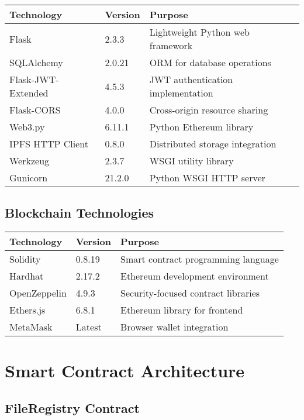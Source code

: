 \documentclass[11pt,a4paper]{article}
\begin{document}
\begin{longtable}{|p{3cm}|p{2cm}|p{8cm}|}
\hline
\textbf{Technology} & \textbf{Version} & \textbf{Purpose} \\
\hline
Flask & 2.3.3 & Lightweight Python web framework \\
\hline
SQLAlchemy & 2.0.21 & ORM for database operations \\
\hline
Flask-JWT-Extended & 4.5.3 & JWT authentication implementation \\
\hline
Flask-CORS & 4.0.0 & Cross-origin resource sharing \\
\hline
Web3.py & 6.11.1 & Python Ethereum library \\
\hline
IPFS HTTP Client & 0.8.0 & Distributed storage integration \\
\hline
Werkzeug & 2.3.7 & WSGI utility library \\
\hline
Gunicorn & 21.2.0 & Python WSGI HTTP server \\
\hline
\end{longtable}

\subsection{Blockchain Technologies}

\begin{longtable}{|p{3cm}|p{2cm}|p{8cm}|}
\hline
\textbf{Technology} & \textbf{Version} & \textbf{Purpose} \\
\hline
Solidity & 0.8.19 & Smart contract programming language \\
\hline
Hardhat & 2.17.2 & Ethereum development environment \\
\hline
OpenZeppelin & 4.9.3 & Security-focused contract libraries \\
\hline
Ethers.js & 6.8.1 & Ethereum library for frontend \\
\hline
MetaMask & Latest & Browser wallet integration \\
\hline
\end{longtable}

\section{Smart Contract Architecture}

\subsection{FileRegistry Contract}
\end{document}
